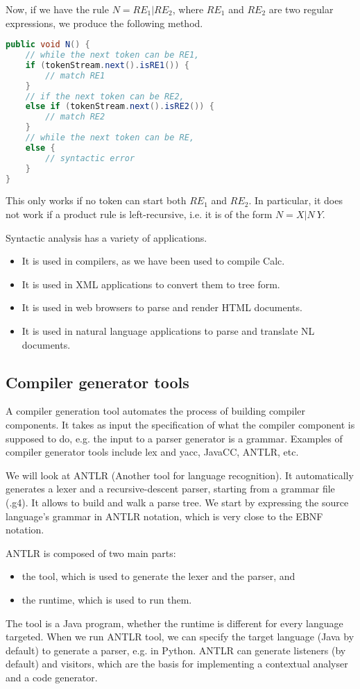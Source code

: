 \documentclass[a4paper, openany]{memoir}
\begin{document}
Now, if we have the rule $N = RE_1 | RE_2$, where $RE_1$ and $RE_2$ are two regular expressions, we produce the following method.
\begin{lstlisting}[language=java]
public void N() {
    // while the next token can be RE1,
    if (tokenStream.next().isRE1()) {
        // match RE1
    }
    // if the next token can be RE2,
    else if (tokenStream.next().isRE2()) {
        // match RE2
    }
    // while the next token can be RE,
    else {
        // syntactic error
    }
}
\end{lstlisting}
This only works if no token can start both $RE_1$ and $RE_2$. In particular, it does not work if a product rule is left-recursive, i.e. it is of the form $N = X | N \ Y$.

Syntactic analysis has a variety of applications.
\begin{itemize}
    \item It is used in compilers, as we have been used to compile Calc.
    \item It is used in XML applications to convert them to tree form.
    \item It is used in web browsers to parse and render HTML documents.
    \item It is used in natural language applications to parse and translate NL documents.
\end{itemize}

\subsection{Compiler generator tools}
A compiler generation tool automates the process of building compiler components. It takes as input the specification of what the compiler component is supposed to do, e.g. the input to a parser generator is a grammar. Examples of compiler generator tools include lex and yacc, JavaCC, ANTLR, etc.

We will look at ANTLR (Another tool for language recognition). It automatically generates a lexer and a recursive-descent parser, starting from a grammar file (.g4). It allows to build and walk a parse tree. We start by expressing the source language's grammar in ANTLR notation, which is very close to the EBNF notation.

ANTLR is composed of two main parts:
\begin{itemize}
    \item the tool, which is used to generate the lexer and the parser, and
    \item the runtime, which is used to run them.
\end{itemize}
The tool is a Java program, whether the runtime is different for every language targeted. When we run ANTLR tool, we can specify the target language (Java by default) to generate a parser, e.g. in Python. ANTLR can generate listeners (by default) and visitors, which are the basis for implementing a contextual analyser and a code generator.
\end{document}
